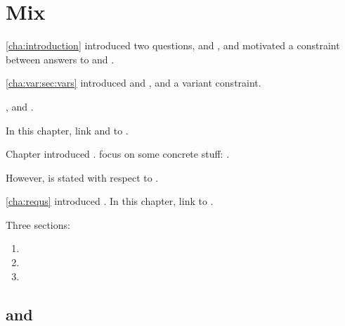 \chapter{Mix}
\label{cha:binding}

\begin{note}
  \autoref{cha:introduction} introduced two questions, \qWhy{} and \qHow{}, and motivated a constraint between answers to \qWhy{} and \qHow{}.

  \autoref{cha:var:sec:vars} introduced \qWhyV{} and \qHowV{}, and a variant constraint.

  \fc{}, and \requ{}.

  In this chapter, link  and  to \qWhyV{}.
\end{note}

\begin{note}
  Chapter introduced .
   focus on some concrete stuff: .

  However, \qWhyV{} is stated with respect to \ros{}.
\end{note}


\begin{note}
  \autoref{cha:requs} introduced .
  In this chapter, link  to \qWhyV{}.
\end{note}

\begin{note}
  Three sections:
  \begin{enumerate}[label=]
  \item
  \item
  \item
  \end{enumerate}
\end{note}

\section{ and }
\label{cha:binding:sec:requRos}

